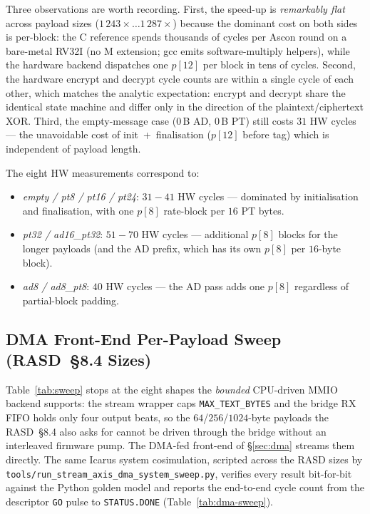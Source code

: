 \documentclass[11pt,a4paper]{article}
\begin{document}
Three observations are worth recording. First, the speed-up is
\textit{remarkably flat} across payload sizes (\(1\,243\times \dots
1\,287\times\)) because the dominant cost on both sides is per-block:
the C reference spends thousands of cycles per Ascon round on a
bare-metal RV32I (no M extension; gcc emits software-multiply
helpers), while the hardware backend dispatches one $p[12]$ per block
in tens of cycles. Second, the hardware encrypt and decrypt cycle
counts are within a single cycle of each other, which matches the
analytic expectation: encrypt and decrypt share the identical state
machine and differ only in the direction of the plaintext/ciphertext
XOR. Third, the empty-message case ($0$\,B AD, $0$\,B PT) still costs
$31$ HW cycles --- the unavoidable cost of init~+~finalisation
($p[12]$ before tag) which is independent of payload length.

The eight HW measurements correspond to:
\begin{itemize}[noitemsep, topsep=2pt]
  \item \textit{empty / pt8 / pt16 / pt24}: $31{-}41$ HW cycles ---
        dominated by initialisation and finalisation, with one
        $p[8]$ rate-block per $16$ PT bytes.
  \item \textit{pt32 / ad16\_pt32}: $51{-}70$ HW cycles --- additional
        $p[8]$ blocks for the longer payloads (and the AD prefix,
        which has its own $p[8]$ per $16$-byte block).
  \item \textit{ad8 / ad8\_pt8}: $40$ HW cycles --- the AD pass adds
        one $p[8]$ regardless of partial-block padding.
\end{itemize}

\subsection{DMA Front-End Per-Payload Sweep (RASD~§8.4 Sizes)}
\label{sec:dma-sweep}

Table~\ref{tab:sweep} stops at the eight shapes the \emph{bounded}
CPU-driven MMIO backend supports: the stream wrapper caps
\texttt{MAX\_TEXT\_BYTES} and the bridge RX FIFO holds only four output
beats, so the $64$/$256$/$1024$-byte payloads the RASD~§8.4 also asks
for cannot be driven through the bridge without an interleaved firmware
pump. The DMA-fed front-end of §\ref{sec:dma} streams them directly. The
same Icarus system cosimulation, scripted across the RASD sizes by
\texttt{tools/run\_stream\_axis\_dma\_system\_sweep.py}, verifies every
result bit-for-bit against the Python golden model and reports the
end-to-end cycle count from the descriptor \texttt{GO} pulse to
\texttt{STATUS.DONE} (Table~\ref{tab:dma-sweep}).
\end{document}

